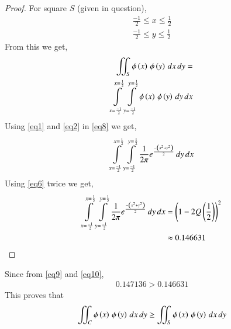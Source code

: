 \documentclass[journal,12pt,twocolumn]{IEEEtran}
\begin{document}
\begin{proof}
For square $S$ (given in question),
\begin{align}
    \frac{-1}{2}\leq x \leq \frac{1}{2}\\
    \frac{-1}{2}\leq y \leq \frac{1}{2}
\end{align}
From this we get,
\begin{align}
    \iint_S{\phi\left(x\right)\,\phi\left(y\right)\,dx\,dy} = \nonumber\\
    \int\limits_{x=\frac{-1}{2}}^{x=\frac{1}{2}} \int\limits_{y=\frac{-1}{2}}^{y=\frac{1}{2}} \phi\left(x\right)\,\phi\left(y\right)\,dy\,dx \label{eq8}
\end{align}
Using \eqref{eq1} and \eqref{eq2} in \eqref{eq8} we get,
\begin{align}
    \int\limits_{x=\frac{-1}{2}}^{x=\frac{1}{2}} \int\limits_{y=\frac{-1}{2}}^{y=\frac{1}{2}}\frac{1}{2\pi}e^\frac{-\left(x^2+y^2\right)}{2}\,dy\,dx
\end{align}
Using \eqref{eq6} twice we get,
\begin{align}
    \int\limits_{x=\frac{-1}{2}}^{x=\frac{1}{2}} \int\limits_{y=\frac{-1}{2}}^{y=\frac{1}{2}}\frac{1}{2\pi}e^\frac{-\left(x^2+y^2\right)}{2}\,dy\,dx &= \left(1-2Q\left(\frac{1}{2}\right)\right)^2\\
    &\approx 0.146631
\end{align}
\end{proof}
\begin{solution}
Since from \eqref{eq9} and \eqref{eq10},
\begin{align}
    0.147136 > 0.146631
\end{align}
This proves that 
\begin{align}
     \iint_C{\phi\left(x\right)\,\phi\left(y\right)\,dx\,dy} \geq \iint_S{\phi\left(x\right)\,\phi\left(y\right)\,dx\,dy}
\end{align}
\end{solution}
\end{document}
